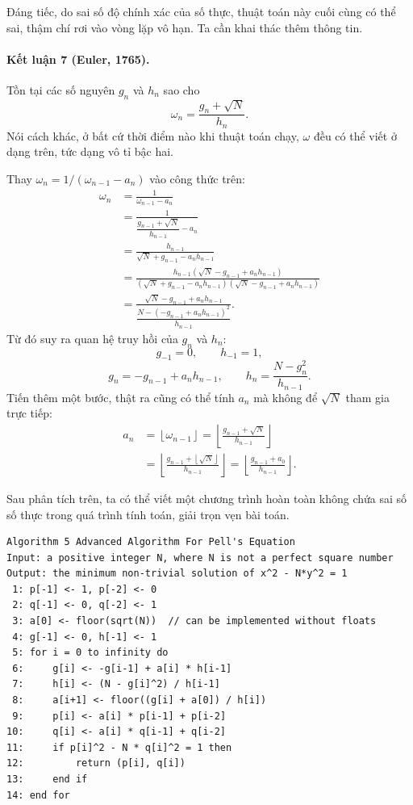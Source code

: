 \documentclass[11pt]{article}
\newcommand{\floor}[1]{\left\lfloor #1\right\rfloor}
\begin{document}
Đáng tiếc, do sai số độ chính xác của số thực, thuật toán này cuối cùng có thể
sai, thậm chí rơi vào vòng lặp vô hạn. Ta cần khai thác thêm thông tin.

\paragraph{Kết luận 7 (Euler, 1765).}
Tồn tại các số nguyên $g_n$ và $h_n$ sao cho
\[
  \omega_n=\frac{g_n+\sqrt N}{h_n}.
\]
Nói cách khác, ở bất cứ thời điểm nào khi thuật toán chạy, $\omega$ đều có thể
viết ở dạng trên, tức dạng vô tỉ bậc hai.

Thay $\omega_n=1/(\omega_{n-1}-a_n)$ vào công thức trên:
\[
\begin{aligned}
  \omega_n
    &=\frac{1}{\omega_{n-1}-a_n}\\
    &=\frac{1}{\dfrac{g_{n-1}+\sqrt N}{h_{n-1}}-a_n}\\
    &=\frac{h_{n-1}}{\sqrt N+g_{n-1}-a_nh_{n-1}}\\
    &=\frac{h_{n-1}(\sqrt N-g_{n-1}+a_nh_{n-1})}
      {(\sqrt N+g_{n-1}-a_nh_{n-1})(\sqrt N-g_{n-1}+a_nh_{n-1})}\\
    &=\frac{\sqrt N-g_{n-1}+a_nh_{n-1}}
      {\dfrac{N-(-g_{n-1}+a_nh_{n-1})^2}{h_{n-1}}}.
\end{aligned}
\]
Từ đó suy ra quan hệ truy hồi của $g_n$ và $h_n$:
\[
  g_{-1}=0,\qquad h_{-1}=1,
\]
\[
  g_n=-g_{n-1}+a_nh_{n-1},\qquad
  h_n=\frac{N-g_n^2}{h_{n-1}}.
\]
Tiến thêm một bước, thật ra cũng có thể tính $a_n$ mà không để $\sqrt N$ tham
gia trực tiếp:
\[
\begin{aligned}
  a_n
    &=\floor{\omega_{n-1}}
      =\floor{\frac{g_{n-1}+\sqrt N}{h_{n-1}}}\\
    &=\floor{\frac{g_{n-1}+\floor{\sqrt N}}{h_{n-1}}}
      =\floor{\frac{g_{n-1}+a_0}{h_{n-1}}}.
\end{aligned}
\]

Sau phân tích trên, ta có thể viết một chương trình hoàn toàn không chứa sai
số số thực trong quá trình tính toán, giải trọn vẹn bài toán.

\begin{verbatim}
Algorithm 5 Advanced Algorithm For Pell's Equation
Input: a positive integer N, where N is not a perfect square number
Output: the minimum non-trivial solution of x^2 - N*y^2 = 1
 1: p[-1] <- 1, p[-2] <- 0
 2: q[-1] <- 0, q[-2] <- 1
 3: a[0] <- floor(sqrt(N))  // can be implemented without floats
 4: g[-1] <- 0, h[-1] <- 1
 5: for i = 0 to infinity do
 6:     g[i] <- -g[i-1] + a[i] * h[i-1]
 7:     h[i] <- (N - g[i]^2) / h[i-1]
 8:     a[i+1] <- floor((g[i] + a[0]) / h[i])
 9:     p[i] <- a[i] * p[i-1] + p[i-2]
10:     q[i] <- a[i] * q[i-1] + q[i-2]
11:     if p[i]^2 - N * q[i]^2 = 1 then
12:         return (p[i], q[i])
13:     end if
14: end for
\end{verbatim}
\end{document}

